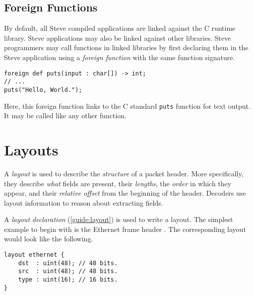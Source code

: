 \subsection{Foreign Functions} \label{tut:foreign}

By default, all Steve compiled applications are linked against the C runtime
library. Steve applications may also be linked against other libraries.
Steve programmers may call functions in linked libraries by first declaring
them in the Steve application using a \emph{foreign function} with the same
function signature.

\begin{codepage}
\begin{lstlisting}
foreign def puts(input : char[]) -> int;
// ...
puts("Hello, World.");
\end{lstlisting}
\end{codepage}

Here, this foreign function links to the C standard \texttt{puts} function
for text output. It may be called like any other function.

\section{Layouts} \label{tut:layout}

A \textit{layout} is used to describe 
the \textit{structure} of a packet header.
More specifically, they describe \textit{what} fields are present, their
\textit{lengths}, the \textit{order} in which they appear, and their
\textit{relative offset} from the beginning of the header. 
Decoders use layout information to reason about extracting fields.


A \emph{layout declaration} (\ref{guide:layout}) is used to write a layout.
The simplest example to begin with is the Ethernet frame header \cite{eth_std}.
The corresponding layout would look like the following.  

\begin{codepage}
\begin{lstlisting}
layout ethernet {
	dst  : uint(48); // 48 bits.
	src  : uint(48); // 48 bits.
	type : uint(16); // 16 bits.
}
\end{lstlisting}
\end{codepage}

